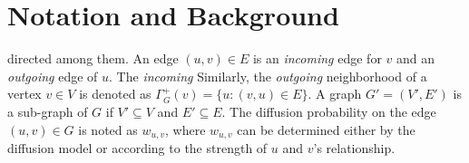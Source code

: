 
\section{Notation and Background}\label{sec:background}

 directed  among them. An edge $(u,v) \in E$ is an {\em incoming} edge for $v$ and an {\em outgoing} edge of $u$. The {\em incoming}  Similarly, the {\em outgoing} neighborhood of a vertex $v \in V$ is denoted as $\Gamma^+_{G}(v) = \{u: (v,u) \in E\}$. A graph $G' = (V',E')$ is a sub-graph of $G$ if $V' \subseteq V$ and $E' \subseteq E$. The diffusion probability on the edge $(u, v) \in G$ is noted as $w_{u,v}$, where $w_{u,v}$ can be determined either by the diffusion model or according to the strength of $u$ and $v$'s relationship.

